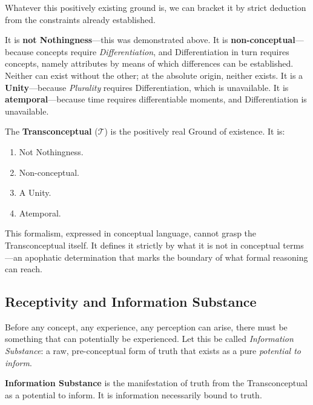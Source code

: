 Whatever this positively existing ground is, we can bracket it by strict
deduction from the constraints already established.

It is \textbf{not Nothingness}---this was demonstrated above. It is
\textbf{non-conceptual}---because concepts require \textit{Differentiation},
and Differentiation in turn requires concepts, namely attributes by means of
which differences can be established. Neither can exist without the other; at
the absolute origin, neither exists. It is a \textbf{Unity}---because
\textit{Plurality} requires Differentiation, which is unavailable. It is
\textbf{atemporal}---because time requires differentiable moments, and
Differentiation is unavailable.

\begin{formalism}
    The \textbf{Transconceptual} ($\mathcal{T}$) is the positively real Ground
    of existence. It is:
    \begin{enumerate}[label=(\roman*)]
        \item Not Nothingness.
        \item Non-conceptual.
        \item A Unity.
        \item Atemporal.
    \end{enumerate}
\end{formalism}

This formalism, expressed in conceptual language, cannot grasp the
Transconceptual itself. It defines it strictly by what it is not in conceptual
terms---an apophatic determination that marks the boundary of what formal
reasoning can reach.

\subsection{Receptivity and Information Substance}

Before any concept, any experience, any perception can arise, there must be
something that can potentially be experienced. Let this be called
\textit{Information Substance}: a raw, pre-conceptual form of truth that exists
as a pure \textit{potential to inform}.

\begin{formalism}
    \textbf{Information Substance} is the manifestation of truth from the
    Transconceptual as a potential to inform. It is information necessarily
    bound to truth.
\end{formalism}

